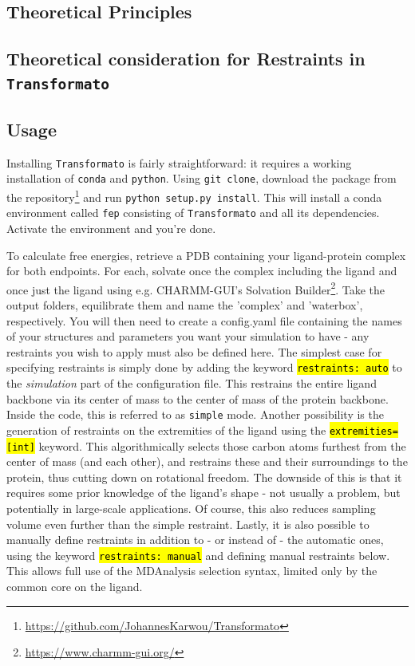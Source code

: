\documentclass[oneside]{scrreprt}
\newcommand{\code}[1]{\texttt{\hl{#1}}}
\begin{document}
\subsection{Theoretical Principles}
\subsection{Theoretical consideration for Restraints in \texttt{Transformato}}
\subsection{Usage}
Installing \texttt{Transformato} is fairly straightforward: it requires a working installation of \texttt{conda} and \texttt{python}. Using \texttt{git clone}, download the package from the repository\footnote{\url{https://github.com/JohannesKarwou/Transformato}} and run \texttt{python setup.py install}. This will install a conda environment called \texttt{fep} consisting of \texttt{Transformato} and all its dependencies. Activate the environment and you're done.

To calculate free energies, retrieve a PDB containing your ligand-protein complex for both endpoints. For each, solvate once the complex including the ligand and once just the ligand using e.g. CHARMM-GUI's Solvation Builder\footnote{\url{https://www.charmm-gui.org/}}. Take the output folders, equilibrate them and name the 'complex' and 'waterbox', respectively. You will then need to create a config.yaml file containing the names of your structures and parameters you want your simulation to have - any restraints you wish to apply must also be defined here. The simplest case for specifying restraints is simply done by adding the keyword \code{restraints: auto} to the \emph{simulation} part of the configuration file. This restrains the entire ligand backbone via its center of mass to the center of mass of the protein backbone. Inside the code, this is referred to as \texttt{simple} mode. Another possibility is the generation of restraints on the extremities of the ligand using the \code{extremities=[int]} keyword. This algorithmically selects those carbon atoms furthest from the center of mass (and each other), and restrains these and their surroundings to the protein, thus cutting down on rotational freedom. The downside of this is that it requires some prior knowledge of the ligand's shape - not usually a problem, but potentially in large-scale applications. Of course, this also reduces sampling volume even further than the simple restraint. Lastly, it is also possible to manually define restraints in addition to - or instead of - the automatic ones, using the keyword \code{restraints: manual} and defining manual restraints below. This allows full use of the MDAnalysis\supercite{agrawal2011,oliver_beckstein-proc-scipy-2016} selection syntax, limited only by the common core on the ligand.
\end{document}

